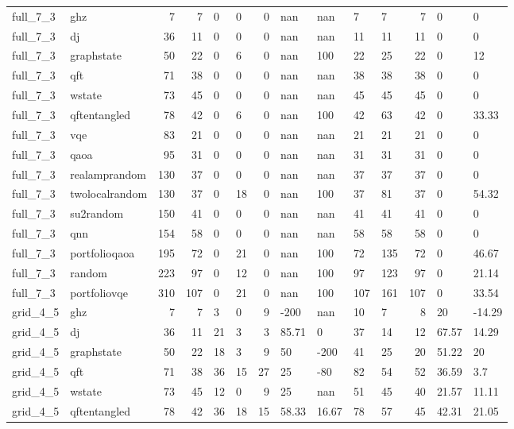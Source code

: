 \begin{longtable}{llrrllrllllrll}
full\_7\_3 & ghz & 7 & 7 & 0 & 0 & 0 & nan & nan & 7 & 7 & 7 & 0 & 0 \\
full\_7\_3 & dj & 36 & 11 & 0 & 0 & 0 & nan & nan & 11 & 11 & 11 & 0 & 0 \\
full\_7\_3 & graphstate & 50 & 22 & 0 & 6 & 0 & nan & 100 & 22 & 25 & 22 & 0 & 12 \\
full\_7\_3 & qft & 71 & 38 & 0 & 0 & 0 & nan & nan & 38 & 38 & 38 & 0 & 0 \\
full\_7\_3 & wstate & 73 & 45 & 0 & 0 & 0 & nan & nan & 45 & 45 & 45 & 0 & 0 \\
full\_7\_3 & qftentangled & 78 & 42 & 0 & 6 & 0 & nan & 100 & 42 & 63 & 42 & 0 & 33.33 \\
full\_7\_3 & vqe & 83 & 21 & 0 & 0 & 0 & nan & nan & 21 & 21 & 21 & 0 & 0 \\
full\_7\_3 & qaoa & 95 & 31 & 0 & 0 & 0 & nan & nan & 31 & 31 & 31 & 0 & 0 \\
full\_7\_3 & realamprandom & 130 & 37 & 0 & 0 & 0 & nan & nan & 37 & 37 & 37 & 0 & 0 \\
full\_7\_3 & twolocalrandom & 130 & 37 & 0 & 18 & 0 & nan & 100 & 37 & 81 & 37 & 0 & 54.32 \\
full\_7\_3 & su2random & 150 & 41 & 0 & 0 & 0 & nan & nan & 41 & 41 & 41 & 0 & 0 \\
full\_7\_3 & qnn & 154 & 58 & 0 & 0 & 0 & nan & nan & 58 & 58 & 58 & 0 & 0 \\
full\_7\_3 & portfolioqaoa & 195 & 72 & 0 & 21 & 0 & nan & 100 & 72 & 135 & 72 & 0 & 46.67 \\
full\_7\_3 & random & 223 & 97 & 0 & 12 & 0 & nan & 100 & 97 & 123 & 97 & 0 & 21.14 \\
full\_7\_3 & portfoliovqe & 310 & 107 & 0 & 21 & 0 & nan & 100 & 107 & 161 & 107 & 0 & 33.54 \\
grid\_4\_5 & ghz & 7 & 7 & 3 & 0 & 9 & -200 & nan & 10 & 7 & 8 & 20 & -14.29 \\
grid\_4\_5 & dj & 36 & 11 & 21 & 3 & 3 & 85.71 & 0 & 37 & 14 & 12 & 67.57 & 14.29 \\
grid\_4\_5 & graphstate & 50 & 22 & 18 & 3 & 9 & 50 & -200 & 41 & 25 & 20 & 51.22 & 20 \\
grid\_4\_5 & qft & 71 & 38 & 36 & 15 & 27 & 25 & -80 & 82 & 54 & 52 & 36.59 & 3.7 \\
grid\_4\_5 & wstate & 73 & 45 & 12 & 0 & 9 & 25 & nan & 51 & 45 & 40 & 21.57 & 11.11 \\
grid\_4\_5 & qftentangled & 78 & 42 & 36 & 18 & 15 & 58.33 & 16.67 & 78 & 57 & 45 & 42.31 & 21.05 \\

\end{longtable}
